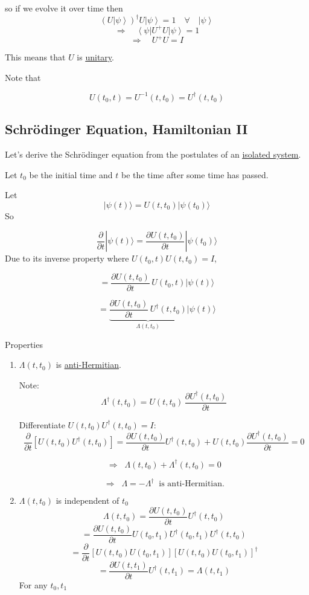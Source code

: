 \documentclass[
]{article}
\providecommand{\tightlist}{%
  \setlength{\itemsep}{0pt}\setlength{\parskip}{0pt}}
\let\oldhyperref\hyperref
\renewcommand{\hyperref}[2][]{\oldhyperref[#1]{\underline{#2}}}
\providecommand{\ket}[1]{\left\lvert #1 \right\rangle}
\providecommand{\bra}[1]{\left\langle #1 \right\rvert}
\providecommand{\Rarr}{\Rightarrow}
\begin{document}
so if we evolve it over time then
\[
	(U\ket{\psi})^\dag U\ket{\psi}=1\quad\forall\quad\ket{\psi}
\]
\[
	\Rarr \quad \bra{\psi}U^+U \ket{\psi}=1
\]
\[
	\Rarr \quad U^+U=I
\]

This means that $U$ is \hyperref[unitary-operator]{unitary}.

Note that

\[
	U(t_0,t)=U^{-1}(t,t_0)=U^\dag(t,t_0)
\]
\subsection{Schrödinger Equation, Hamiltonian II}\label{schrodinger-equation}
Let's derive the Schrödinger equation from the postulates of an \hyperref[isolated-system]{isolated system}.

Let $t_0$ be the initial time and $t$ be the time after some time has passed.

Let
\[
	|\psi(t)\rangle = U(t, t_0) |\psi(t_0)\rangle
\]
So

\[
	\frac{\partial}{\partial t} |\psi(t)\rangle = \frac{\partial U(t, t_0)}{\partial t} |\psi(t_0)\rangle
\]
Due to its inverse property where $U(t_0,t)U(t,t_0)=I$,

\[
	= \frac{\partial U(t, t_0)}{\partial t} \, U(t_0, t) |\psi(t)\rangle
\]

\[
	= \underbrace{\frac{\partial U(t, t_0)}{\partial t} \, U^\dagger(t, t_0)}_{\Lambda(t, t_0)} |\psi(t)\rangle
\]


Properties
\begin{enumerate}
	\tightlist
	\item \(\Lambda(t, t_0)\) is \hyperref[anti-hermitian-operators]{anti-Hermitian}.

	      Note:
	      \[
		      \Lambda^\dagger(t, t_0) = U(t, t_0) \, \frac{\partial U^\dagger(t, t_0)}{\partial t}
	      \]

	      Differentiate \(U(t, t_0) U^\dagger(t, t_0) = I\):
	      \[
		      \frac{\partial}{\partial t}\!\left[U(t, t_0) U^\dagger(t, t_0)\right] = \frac{\partial U(t, t_0)}{\partial t} U^\dagger(t, t_0) + U(t, t_0) \frac{\partial U^\dagger(t, t_0)}{\partial t} = 0
	      \]

	      \[
		      \Rightarrow \;\; \Lambda(t, t_0) + \Lambda^\dagger(t, t_0) = 0
	      \]

	      \[
		      \Rightarrow \;\; \Lambda = -\Lambda^\dagger \;\;\text{is anti-Hermitian.}
	      \]
	\item \(\Lambda(t, t_0)\) is independent of $t_0$
	      \[
		      \Lambda (t,t_0)=\frac{\partial U(t, t_0)}{\partial t} U^\dagger(t, t_0)
	      \]
	      \[
		      =\frac{\partial U(t, t_0)}{\partial t} U(t_0,t_1)U^\dag(t_0,t_1)
		      U^\dagger(t, t_0)
	      \]
	      \[
		      =\frac{\partial}{\partial t}[U(t,t_0)U(t_0,t_1)][U(t,t_0)U(t_0, t_1)]^\dag
	      \]
	      \[
		      =\frac{\partial U(t,t_1)}{\partial t}U^\dag(t,t_1)=\Lambda (t,t_1)
	      \]
	      For any $t_0,t_1$
\end{enumerate}
\end{document}
